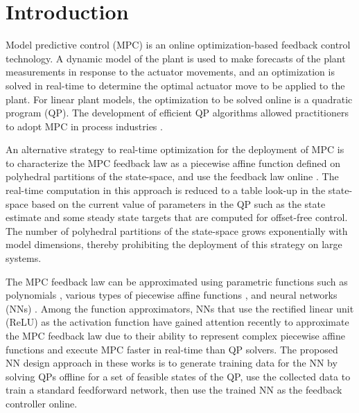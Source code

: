 \documentclass[preprint,5p, twocolumn, authoryear]{elsarticle}
\begin{document}
\section{Introduction} \label{sec:introduction}

Model predictive control (MPC) is an online 
optimization-based feedback control technology. A dynamic model 
of the plant is used to make forecasts of the plant measurements
in response to the actuator movements, and an optimization
is solved in real-time to determine the optimal actuator
move to be applied to the plant. For linear plant models, 
the optimization to be solved online is a quadratic program (QP).
The development 
of efficient QP algorithms 
\citep*{kouzoupis:frison:zanelli:diehl:2018, wright:2019}
allowed practitioners to adopt MPC
in process industries \citep*{qin:badgwell:2003, lahiri:2017}.

An alternative strategy to 
real-time optimization for the deployment of MPC 
is to characterize the MPC feedback law
as a piecewise affine function defined on 
polyhedral partitions of the state-space, 
and use the feedback law online
\citep*{bemporad:morari:dua:pistikopoulos:2002, 
seron:goodwin:dedona:2003}.
The real-time computation in this approach is 
reduced to a table look-up in the state-space
based on the current value of parameters 
in the QP such as the state estimate and some 
steady state targets that are computed for 
offset-free control. The number of polyhedral 
partitions of the state-space grows exponentially
with model dimensions, thereby prohibiting 
the deployment of this strategy on large systems.

The MPC feedback law can be approximated using 
parametric functions such as polynomials
\citep*{kvasnica:lofberg:fikar:2011}, 
various types of piecewise affine functions
\citep*{bemporad:oliveri:poggi:storace:2011, wen:ma:ydstie:2009},
and neural networks (NNs) \citep*{cavagnari:magni:scattolini:1999}.
Among the
function approximators, NNs that use the rectified linear unit 
(ReLU) as the activation function 
have gained attention recently 
\citep*{chen:saulnier:atanasov:lee:kumar:pappas:morari:2018, 
karg:lucia:2020, paulson:mesbah:2020, lovelett:dietrich:lee:kevrekidis:2020}
to approximate
the MPC feedback law due to their ability to represent complex 
piecewise affine functions
\citep*{montufar:pascanu:cho:bengio:2014}
and execute MPC faster in real-time than QP solvers. 
The proposed NN design approach in 
these works is to generate training 
data for the NN by solving QPs offline
for a set of feasible states of the QP, use the
collected data to train a standard feedforward network, then 
use the trained NN as the feedback controller online.
\end{document}
